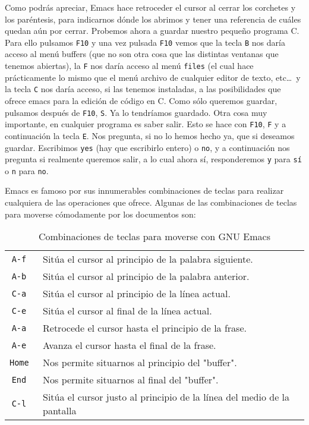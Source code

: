 Como podrás  apreciar, Emacs hace  retroceder el cursor al  cerrar los
corchetes y los paréntesis, para  indicarnos dónde los abrimos y tener
una  referencia de  cuáles quedan  aún  por cerrar.  Probemos ahora  a
guardar nuestro pequeño programa C. Para ello pulsamos {\tt F10} y una
vez pulsada {\tt F10}  vemos que la tecla {\tt B}  nos daría acceso al
menú buffers  (que no  son otra  cosa que  las distintas  ventanas que
tenemos abiertas), la {\tt F} nos daría acceso al menú {\tt files} (el
cual  hace prácticamente  lo mismo  que el  menú archivo  de cualquier
editor de texto,  etc\dots \ y la  tecla {\tt C} nos  daría acceso, si
las tenemos instaladas,  a las posibilidades que ofrece  emacs para la
edición de código  en C. Como sólo queremos  guardar, pulsamos después
de  {\tt F10},  {\tt  S}. Ya  lo tendríamos  guardado.  Otra cosa  muy
importante, en  cualquier programa  es saber salir.  Esto se  hace con
{\tt F10}, {\tt F} y a continuación la tecla {\tt E}. Nos pregunta, si
no lo  hemos hecho ya, que  si deseamos guardar. Escribimos  {\tt yes}
(hay que escribirlo entero) o {\tt  no}, y a continuación nos pregunta
si realmente queremos salir, a lo cual ahora sí, responderemos {\tt y}
para {\tt sí} o {\tt n} para {\tt no}.

Emacs  es famoso  por sus  innumerables combinaciones  de teclas  para
realizar  cualquiera de  las operaciones  que ofrece.  Algunas de  las
combinaciones de  teclas para  moverse cómodamente por  los documentos
son:

\begin{table}[htbp]
\centering
\begin{tabular}{|c|l|}
\hline
{\tt A-f  } & Sitúa el cursor al principio de la palabra siguiente. \\
{\tt A-b  } & Sitúa el cursor al principio de la palabra anterior. \\
{\tt C-a  } & Sitúa el cursor al principio de la línea actual. \\
{\tt C-e  } & Sitúa el cursor al final de la línea actual. \\
{\tt A-a  } & Retrocede el cursor hasta el principio de la frase. \\
{\tt A-e  } & Avanza el cursor hasta el final de la frase. \\
{\tt Home } & Nos permite situarnos al principio del "buffer". \\
{\tt End  } & Nos permite situarnos al final del "buffer". \\
{\tt C-l  } & Sitúa el cursor justo al principio de la línea del medio de la pantalla \\
\hline
\end{tabular}
\caption{Combinaciones de teclas para moverse con GNU Emacs}
\end{table}


